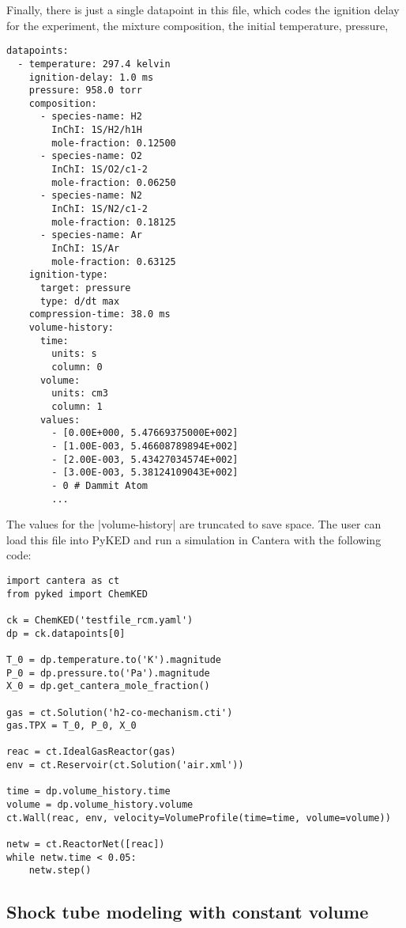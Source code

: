 \documentclass[12pt]{ussci}
\newcommand\pk{PyKED}
\begin{document}
Finally, there is just a single datapoint in this file, which codes the ignition
delay for the experiment, the mixture composition, the initial temperature,
pressure,
%
\begin{verbatim}
datapoints:
  - temperature: 297.4 kelvin
    ignition-delay: 1.0 ms
    pressure: 958.0 torr
    composition:
      - species-name: H2
        InChI: 1S/H2/h1H
        mole-fraction: 0.12500
      - species-name: O2
        InChI: 1S/O2/c1-2
        mole-fraction: 0.06250
      - species-name: N2
        InChI: 1S/N2/c1-2
        mole-fraction: 0.18125
      - species-name: Ar
        InChI: 1S/Ar
        mole-fraction: 0.63125
    ignition-type:
      target: pressure
      type: d/dt max
    compression-time: 38.0 ms
    volume-history:
      time:
        units: s
        column: 0
      volume:
        units: cm3
        column: 1
      values:
        - [0.00E+000, 5.47669375000E+002]
        - [1.00E-003, 5.46608789894E+002]
        - [2.00E-003, 5.43427034574E+002]
        - [3.00E-003, 5.38124109043E+002]
        - 0 # Dammit Atom
        ...
\end{verbatim}

The values for the \yaml|volume-history| are truncated to save space. The user
can load this file into \pk{} and run a simulation in Cantera with the following
code:

\begin{verbatim}
import cantera as ct
from pyked import ChemKED

ck = ChemKED('testfile_rcm.yaml')
dp = ck.datapoints[0]

T_0 = dp.temperature.to('K').magnitude
P_0 = dp.pressure.to('Pa').magnitude
X_0 = dp.get_cantera_mole_fraction()

gas = ct.Solution('h2-co-mechanism.cti')
gas.TPX = T_0, P_0, X_0

reac = ct.IdealGasReactor(gas)
env = ct.Reservoir(ct.Solution('air.xml'))

time = dp.volume_history.time
volume = dp.volume_history.volume
ct.Wall(reac, env, velocity=VolumeProfile(time=time, volume=volume))

netw = ct.ReactorNet([reac])
while netw.time < 0.05:
    netw.step()

\end{verbatim}

\subsection{Shock tube modeling with constant volume}\label{sec:shock-tube}
\end{document}
